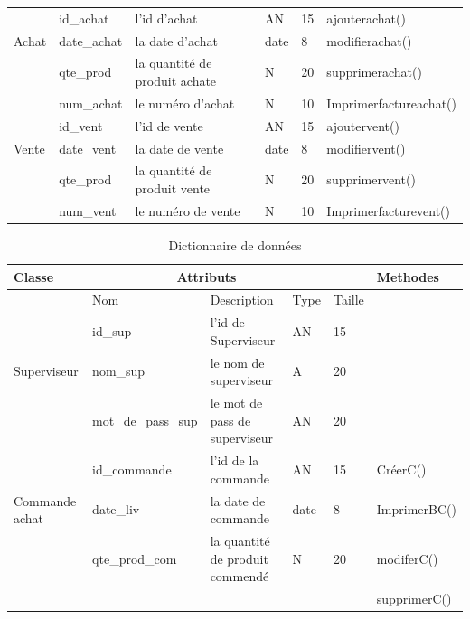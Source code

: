 \documentclass[edit,12pt,a4paper,ChapStyle,oneside,doubleinterligne]{report}
\begin{document}
\begin{table}[H]
\begin{tabular}{ | m{} | m{}| m{3cm} |m{}|m{}|l|}
                    &id\_achat  &l'id d'achat&AN&15&ajouterachat()\\\cline{2-6}
    Achat           &date\_achat&la date d'achat&date&8&modifierachat()\\\cline{2-6}
                    &qte\_prod  &la quantité de produit achate&N&20&supprimerachat()\\\cline{2-6}
                    &num\_achat &le numéro d'achat            &N&10&Imprimerfactureachat()\\\hline

                    &id\_vent  &l'id de vente&AN&15&ajoutervent()\\\cline{2-6}
    Vente            &date\_vent &la date de vente&date&8&modifiervent()\\\cline{2-6}
                    &qte\_prod  &la quantité de produit vente&N&20&supprimervent()\\\cline{2-6}
                    &num\_vent &le numéro de vente            &N&10&Imprimerfacturevent()\\\hline
                    

                    
 \end{tabular}
 
\end{table}
\begin{table}[H]
    \centering
    \begin{tabular}{ | m{} | m{}| m{3cm} |m{}|m{}|l|}
    \hline
         Classe&\multicolumn{3}{c}{Attributs}&\phantom{h} &Methodes\\
         \hline       &Nom&Description&Type&Taille&\\\cline{2-5}
                      &id\_sup&l'id de Superviseur&AN&15& \\\cline{2-5}
         Superviseur  &nom\_sup&le nom de superviseur&A&20& \\\cline{2-5}
                      &mot\_de\_pass\_sup&le mot de pass de superviseur &AN&20& \\\hline
                      

                                          
                    
                    &id\_commande &l'id de la commande&AN&15& CréerC()\\\cline{2-6}
    Commande achat  &date\_liv &la date de commande&date&8&ImprimerBC()\\\cline{2-6}
                    &qte\_prod\_com&la quantité de produit commendé&N&20&modiferC()\\\cline{2-6}
                    &              &                               & &  &supprimerC()\\\hline

                

 \end{tabular}
 \caption{Dictionnaire de données}
\label{tab:Dictionnaire}
\end{table}
\end{document}
